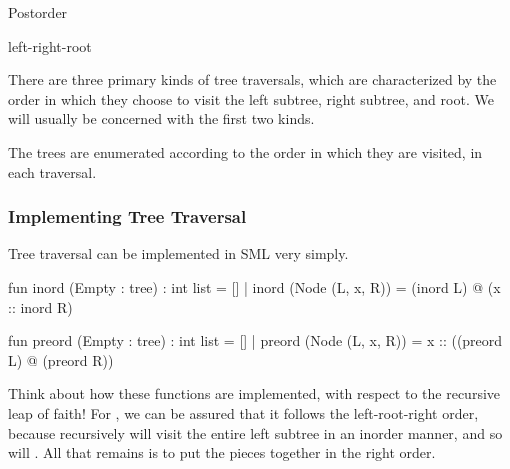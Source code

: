 \documentclass[aspectratio=169]{beamer}
\begin{document}
\begin{frame}[fragile]
\begin{minipage}{0.32\textwidth}
\begin{center}
        \vspace{5pt}

        Postorder

        \vspace{5pt}

        {\color{black!10!red}left}-{\color{black!10!blue}right}-{\color{black!20!green}root}
    \end{center}
  \end{minipage}

  \vspace{\fill}

  There are three primary kinds of tree traversals, which are characterized by the
  order in which they choose to visit the left subtree, right subtree, and root. 
  We will usually be concerned with the first two kinds.

  \vspace{\fill}

  The trees are enumerated according to the order in which they are visited, in
  each traversal.
\end{frame}

\begin{frame}[fragile]
  \frametitle{Implementing Tree Traversal}

  \rprs

  Tree traversal can be implemented in SML very simply.

  \pause
  \begin{codeblock}
    fun inord (Empty : tree) : int list = []
      | inord (Node (L, x, R)) = (inord L) @ (x :: inord R)

    fun preord (Empty : tree) : int list = []
      | preord (Node (L, x, R)) = x :: ((preord L) @ (preord R))
  \end{codeblock}

  \pause
  \vspace{\fill}

  Think about how these functions are implemented, with respect to the
  recursive leap of faith! For , we can be assured that it
  follows the left-root-right order, because recursively 
  will visit the entire left subtree in an inorder manner, and so will
  . All that remains is to put the pieces together in the
  right order.

\end{frame}


\end{document}
